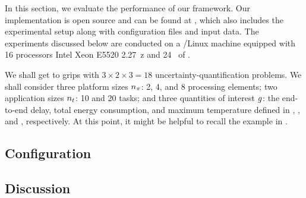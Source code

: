 In this section, we evaluate the performance of our framework. Our
implementation is open source and can be found at \cite{sources}, which also
includes the experimental setup along with configuration files and input data.
The experiments discussed below are conducted on a /Linux machine
equipped with 16 processors Intel Xeon E5520 2.27~z and 24~ of
.

We shall get to grips with $3 \times 2 \times 3 = 18$ uncertainty-quantification
problems. We shall consider three platform sizes ${n_\pi}$: 2, 4, and 8 processing
elements; two application sizes ${n_t}$: 10 and 20 tasks; and three quantities of
interest $g$: the end-to-end delay, total energy consumption, and maximum
temperature defined in , , and
, respectively. At this point, it might be helpful to
recall the example in .

\subsection{Configuration} 


\subsection{Discussion}

